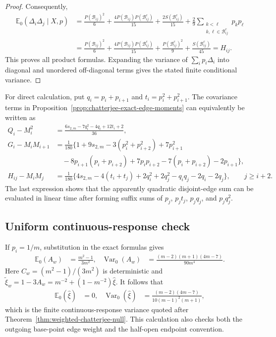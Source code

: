 \begin{proof}
Consequently,
\begin{align*}
  \mathbb E_0(\Delta_i\Delta_j\mid X,p)
  &=\frac{P(\mathcal B_{ij})^2}{6}
    +\frac{4P(\mathcal B_{ij})P(\mathcal B_{ij}^c)}{15}
    +\frac{2S(\mathcal B_{ij}^c)}{15}
    +\frac29
      \sum_{\substack{k<\ell\\k,\ell\in\mathcal B_{ij}^c}}
      p_kp_\ell\\
  &=\frac{P(\mathcal B_{ij})^2}{6}
    +\frac{4P(\mathcal B_{ij})P(\mathcal B_{ij}^c)}{15}
    +\frac{P(\mathcal B_{ij}^c)^2}{9}
    +\frac{S(\mathcal B_{ij}^c)}{45}
  =H_{ij}.
\end{align*}
This proves all product formulas. Expanding the variance of
$\sum_i p_i\Delta_i$ into diagonal and unordered off-diagonal terms gives
the stated finite conditional variance.
\end{proof}

For direct calculation, put $q_i=p_i+p_{i+1}$ and $t_i=p_i^2+p_{i+1}^2$.
The covariance terms in Proposition~\ref{prop:chatterjee-exact-edge-moments}
can equivalently be written as
\begin{align*}
  Q_i-M_i^2
  &=\frac{
    6s_{2,m}-7q_i^2-4q_i+12t_i+2
  }{36},\\
  G_i-M_iM_{i+1}
  &=\frac1{180}\bigl\{
    1+9s_{2,m}-3(p_i^2+p_{i+2}^2)+7p_{i+1}^2\\
  &\quad
    {}-8p_{i+1}(p_i+p_{i+2})+7p_ip_{i+2}
    -7(p_i+p_{i+2})-2p_{i+1}
  \bigr\},\\
  H_{ij}-M_iM_j
  &=\frac1{180}\bigl\{
    4s_{2,m}-4(t_i+t_j)+2q_i^2+2q_j^2
    -q_iq_j-2q_i-2q_j
  \bigr\},\qquad j\geq i+2.
\end{align*}
The last expression shows that the apparently quadratic disjoint-edge sum
can be evaluated in linear time after forming suffix sums of $p_j$, $p_jt_j$,
$p_jq_j$, and $p_jq_j^2$.

\subsection{Uniform continuous-response check}

If $p_i=1/m$, substitution in the exact formulas gives
\begin{align*}
  \mathbb E_0(A_w)
  &=\frac{m^2-1}{3m^2},
  &
  \operatorname{Var}_0(A_w)
  &=\frac{(m-2)(m+1)(4m-7)}{90m^4}.
\end{align*}
Here $C_w=(m^2-1)/(3m^2)$ is deterministic and
$\widetilde\xi_w=1-3A_w=m^{-2}+(1-m^{-2})\widehat\xi$. It follows that
\begin{align*}
  \mathbb E_0(\widehat\xi)
  &=0,
  &
  \operatorname{Var}_0(\widehat\xi)
  &=\frac{(m-2)(4m-7)}{10(m-1)^2(m+1)},
\end{align*}
which is the finite continuous-response variance quoted after
Theorem~\ref{thm:weighted-chatterjee-null}. This calculation also checks
both the outgoing base-point edge weight and the half-open endpoint
convention.


